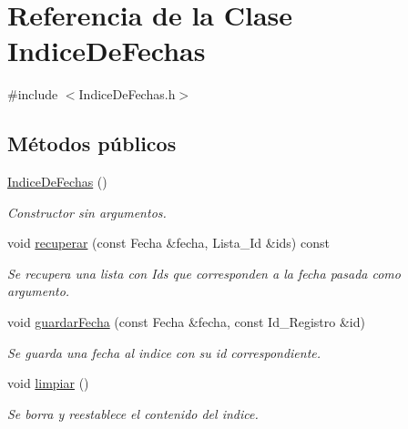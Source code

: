 \hypertarget{classIndiceDeFechas}{\section{\-Referencia de la \-Clase \-Indice\-De\-Fechas}
\label{classIndiceDeFechas}
}


{\ttfamily \#include $<$\-Indice\-De\-Fechas.\-h$>$}

\subsection*{\-Métodos públicos}
\begin{DoxyCompactItemize}
\item 
\hypertarget{classIndiceDeFechas_adbb24ea96af6412784ed12b547035bfa}{\hyperlink{classIndiceDeFechas_adbb24ea96af6412784ed12b547035bfa}{\-Indice\-De\-Fechas} ()}\label{classIndiceDeFechas_adbb24ea96af6412784ed12b547035bfa}

\begin{DoxyCompactList}\small\item\em \-Constructor sin argumentos. \end{DoxyCompactList}\item 
void \hyperlink{classIndiceDeFechas_a3ea1d6d6c6a57a8a53dea9b8adf86468}{recuperar} (const \-Fecha \&fecha, \-Lista\-\_\-\-Id \&ids) const 
\begin{DoxyCompactList}\small\item\em \-Se recupera una lista con \-Ids que corresponden a la fecha pasada como argumento. \end{DoxyCompactList}\item 
void \hyperlink{classIndiceDeFechas_a35d827e4bdd41c60fbb60fb100894292}{guardar\-Fecha} (const \-Fecha \&fecha, const \-Id\-\_\-\-Registro \&id)
\begin{DoxyCompactList}\small\item\em \-Se guarda una fecha al indice con su id correspondiente. \end{DoxyCompactList}\item 
\hypertarget{classIndiceDeFechas_a27f43bb41937c43900ce29bce09a8131}{void \hyperlink{classIndiceDeFechas_a27f43bb41937c43900ce29bce09a8131}{limpiar} ()}\label{classIndiceDeFechas_a27f43bb41937c43900ce29bce09a8131}

\begin{DoxyCompactList}\small\item\em \-Se borra y reestablece el contenido del indice. \end{DoxyCompactList}\end{DoxyCompactItemize}


